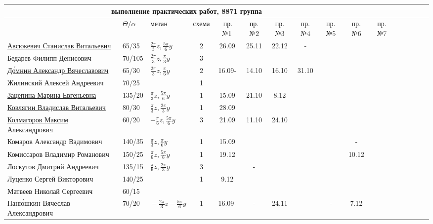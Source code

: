 \documentclass[a4paper,landscape,11pt]{article}
\begin{document}
\newpage
%
\hspace{-4.1cm}
\begin{tabular}{l|llccccccccccccc}
\multicolumn{10}{c}{выполнение практических работ, 8871 группа} \\
\toprule
			&$\Theta/\alpha$&метан&схема&\,пр.№1\,&пр.№2&пр.№3&пр.№4&пр.№5&пр.№6&пр.№7\\
\midrule
	\href{}{Авсюкевич Станислав Витальевич}	        &65/35 &$\frac{2\pi}{3}z,\frac{5\pi}{6}y$&2&\,26.09\,&25.11&22.12&-\\
	Бедарев Филипп Денисович        &70/105&$\frac{2\pi}{3}z,\frac{\pi}{3}y$&3&       &&\\
	\href{}{Д\'{о}мнин Александр Вячеславович}                  &65/30 &$\frac{2\pi}{3}z,\frac{\pi}{6}y$&2&\,16.09-\,&14.10&16.10&31.10\\ 
	Жилинский Алексей Андреевич	&70/25 &&1&       &&\\
	\href{}{Зацепина Марина Евгеньевна}	&135/20&$\frac{\pi}{3}z,\frac{5\pi}{6}y$&1&\,15.09\,&21.10&8.12\\	
	\href{}{Ковлягин Владислав Витальевич}	                &80/30 &$\frac{\pi}{3}z,\frac{2\pi}{3}y$&1&\,28.09\,&&\\
	\href{}{Колмагоров Максим Александрович}	        &60/20 &$-\frac{\pi}{6}z,\frac{5\pi}{6}y$&3&\,21.09\,&11.10&24.10\\
\midrule                                     
	Комаров Александр Вадимович	&140/35&$\frac{\pi}{3}z,\frac{\pi}{6}y$&1&\,15.09\,&&&&&-\\
	Комиссаров Владимир Романович	&150/25&$\frac{\pi}{6}z,\frac{5\pi}{6}y$&1&19.12&&&&&10.12\\
	Лоскутов Дмитрий Андреевич	&135/15&$\frac{\pi}{6}z,\frac{2\pi}{3}y$&3&       &-&\\	
	Луценко Сергей Викторович	&140/25&&       1&9.12&\\	
Матвеев Николай Сергеевич	&60/15\\	
	Пан\'{ю}шкин Вячеслав Александрович\,&70/20 &$\!-\!\frac{2\pi}{3}z\!-\!\frac{5\pi}{6}y\!$&1&\,16.09-\,&-&24.11&&-&7.12\\
\midrule                                  

\end{tabular}
\end{document}
